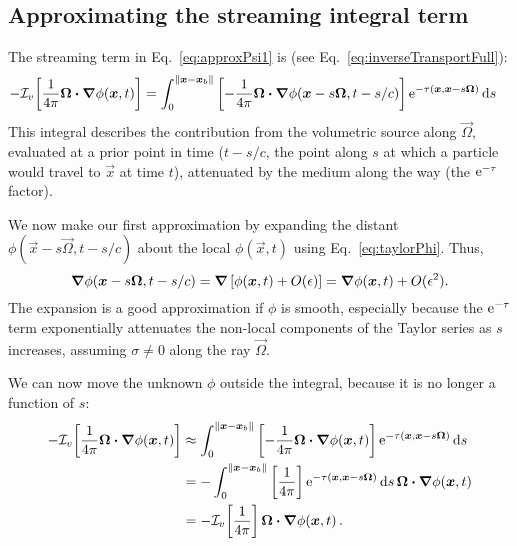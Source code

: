 \subsection{Approximating the streaming integral term}\label{sec:adStreaming}
The streaming term in Eq.~\eqref{eq:approxPsi1} is (see
Eq.~\eqref{eq:inverseTransportFull}):
\begin{align*}
- \mathcal{I}_{v}\!\left[\frac{1}{4\pi} \bm{\Omega}\bm{\cdot} \bm{\nabla} \phi(\bm{x}, t)\right]
  &= \int_{0}^{\left\| \bm{x} - \bm{x}_b \right\|}
    \left[ -\frac1{4\pi}\bm{\Omega}\bm{\cdot} \bm{\nabla} \phi(\bm{x} - s \bm{\Omega},
    t-s/c)
    \right]
    \mathop{}\!\mathrm{e}^{ -\tau(\bm{x}, \bm{x} - s \bm{\Omega})}
    \mathop{}\!\mathrm{d} s
\end{align*}
This integral describes the contribution from the volumetric source  along
$\vec{\Omega}$, evaluated at a prior
point in time ($t-s/c$, the point along $s$ at which a particle would travel
to $\vec{x}$ at time $t$), attenuated by the medium along the way (the
$\mathop{}\!\mathrm{e}^{ -\tau }$ factor).

We now make our first approximation by expanding the distant $\phi(\vec{x} - s
\vec{\Omega}, t-s/c)$ about the local $\phi(\vec{x}, t)$ using
Eq.~\eqref{eq:taylorPhi}. Thus,
\begin{equation*}
  \bm{\nabla} \phi(\bm{x} - s \bm{\Omega}, t-s/c)
  = \bm{\nabla} \left[ \phi(\bm{x}, t) + O(\epsilon) \right]
  = \bm{\nabla} \phi(\bm{x}, t) + O(\epsilon^2).
\end{equation*}
The expansion is a good approximation if $\phi$ is smooth, especially because the
$\mathop{}\!\mathrm{e}^{ -\tau }$ term exponentially attenuates the non-local components of the
Taylor series as $s$ increases, assuming $\sigma\ne 0$ along the ray
$\vec{\Omega}$.

We can now move the unknown $\phi$ outside the integral,
because it is no longer a function of $s$:
\begin{align}\nonumber
- \mathcal{I}_{v}\!\left[\frac{1}{4\pi} \bm{\Omega}\bm{\cdot} \bm{\nabla} \phi(\bm{x}, t)\right]
  &\approx \int_{0}^{\left\| \bm{x} - \bm{x}_b \right\|}
    \left[ -\frac1{4\pi}\bm{\Omega}\bm{\cdot} \bm{\nabla} \phi(\bm{x},t) \right]
    \mathop{}\!\mathrm{e}^{ -\tau(\bm{x}, \bm{x} - s \bm{\Omega})}
    \mathop{}\!\mathrm{d} s
  \\\nonumber
  &= - \int_{0}^{\left\| \bm{x} - \bm{x}_b \right\|}
    \left[ \frac1{4\pi}\right]
    \mathop{}\!\mathrm{e}^{ -\tau(\bm{x}, \bm{x} - s \bm{\Omega})} \mathop{}\!\mathrm{d} s \,
    \bm{\Omega}\bm{\cdot} \bm{\nabla} \phi(\bm{x},t)
  \\\label{eq:streamingApprox}
  &= - \mathcal{I}_{v}\!\left[ \frac1{4\pi} \right] \bm{\Omega}\bm{\cdot} \bm{\nabla} \phi(\bm{x},t)
  \,.
\end{align}

